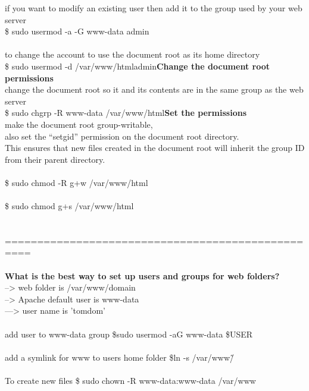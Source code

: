 \documentclass[10pt,a4paper]{article}
\begin{document}
{{{{{{{{{{{{{{{{{if you want to modify an existing user then add it to the group used by your web server\\
\$ sudo usermod -a -G www-data admin}{\large \\
\\
to change the account to use the document root as its home directory\\
\$ sudo usermod -d /var/www/html}{\large admin}{\large \textbf{Change the document root permissions}}{\large \\
change the document root so it and its contents are in the same group as the web server\\
\$ sudo chgrp -R www-data /var/www/html}{\large \textbf{Set the permissions}}{\large \\
make the document root group-writable, \\
also set the ``setgid'' permission on the document root directory}{\large . \\
This ensures that new files created in the document root will inherit the group ID from their parent directory.\\
\\
\$ sudo chmod -R g+w /var/www/html}{\large \\
\\
\$ sudo chmod g+s /var/www/html}{\large \\
\\
\\
==================================================\\
\\
\textbf{What is the best way to set up users and groups for web folders?}}{\large \\
--> web folder is /var/www/domain}{\large \\
--> Apache default user is www-data\\
---> user name is 'tomdom'\\
\\
add user to www-data group                                   \$sudo usermod -aG www-data \$USER}{\large \\
\\
add a symlink for www to users home folder          \$ln -s /var/www}{\large   \~/}{\large \\
\\
To create new files                                                    \$ sudo chown -R www-data:www-data /var/www}{\large {\large \\
\\
\\
}}}}}}}}}}}}}}}}}}
\end{document}
